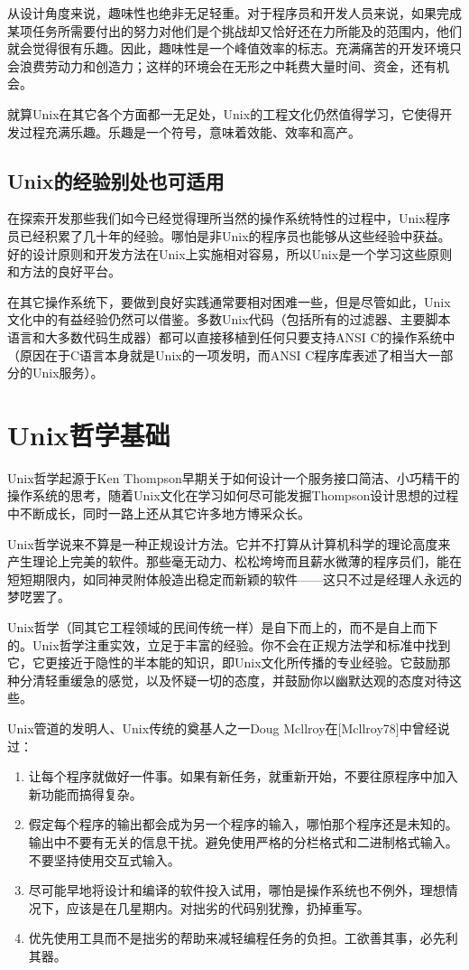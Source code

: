 \documentclass[12pt,oneside]{book}
\begin{document}
\begin{common-format}
从设计角度来说，趣味性也绝非无足轻重。对于程序员和开发人员来说，如果完成某项任务所需要付出的努力对他们是个挑战却又恰好还在力所能及的范围内，他们就会觉得很有乐趣。因此，趣味性是一个峰值效率的标志。充满痛苦的开发环境只会浪费劳动力和创造力；这样的环境会在无形之中耗费大量时间、资金，还有机会。

就算Unix在其它各个方面都一无足处，Unix的工程文化仍然值得学习，它使得开发过程充满乐趣。乐趣是一个符号，意味着效能、效率和高产。

\subsection{Unix的经验别处也可适用}
在探索开发那些我们如今已经觉得理所当然的操作系统特性的过程中，Unix程序员已经积累了几十年的经验。哪怕是非Unix的程序员也能够从这些经验中获益。好的设计原则和开发方法在Unix上实施相对容易，所以Unix是一个学习这些原则和方法的良好平台。

在其它操作系统下，要做到良好实践通常要相对困难一些，但是尽管如此，Unix文化中的有益经验仍然可以借鉴。多数Unix代码（包括所有的过滤器、主要脚本语言和大多数代码生成器）都可以直接移植到任何只要支持ANSI C的操作系统中（原因在于C语言本身就是Unix的一项发明，而ANSI C程序库表述了相当大一部分的Unix服务）。


\section{Unix哲学基础}
Unix哲学起源于Ken Thompson早期关于如何设计一个服务接口简洁、小巧精干的操作系统的思考，随着Unix文化在学习如何尽可能发掘Thompson设计思想的过程中不断成长，同时一路上还从其它许多地方博采众长。

Unix哲学说来不算是一种正规设计方法。它并不打算从计算机科学的理论高度来产生理论上完美的软件。那些毫无动力、松松垮垮而且薪水微薄的程序员们，能在短短期限内，如同神灵附体般造出稳定而新颖的软件——这只不过是经理人永远的梦呓罢了。
    
Unix哲学（同其它工程领域的民间传统一样）是自下而上的，而不是自上而下的。Unix哲学注重实效，立足于丰富的经验。你不会在正规方法学和标准中找到它，它更接近于隐性的半本能的知识，即Unix文化所传播的专业经验。它鼓励那种分清轻重缓急的感觉，以及怀疑一切的态度，并鼓励你以幽默达观的态度对待这些。
   
Unix管道的发明人、Unix传统的奠基人之一Doug Mcllroy在[Mcllroy78]中曾经说过：
\begin{enumerate}
\renewcommand{\labelenumi}{（\roman{enumi}）}
\item 让每个程序就做好一件事。如果有新任务，就重新开始，不要往原程序中加入新功能而搞得复杂。
\item 假定每个程序的输出都会成为另一个程序的输入，哪怕那个程序还是未知的。输出中不要有无关的信息干扰。避免使用严格的分栏格式和二进制格式输入。不要坚持使用交互式输入。
\item 尽可能早地将设计和编译的软件投入试用，哪怕是操作系统也不例外，理想情况下，应该是在几星期内。对拙劣的代码别犹豫，扔掉重写。
\item 优先使用工具而不是拙劣的帮助来减轻编程任务的负担。工欲善其事，必先利其器。
\end{enumerate}


\end{common-format}
\end{document}

